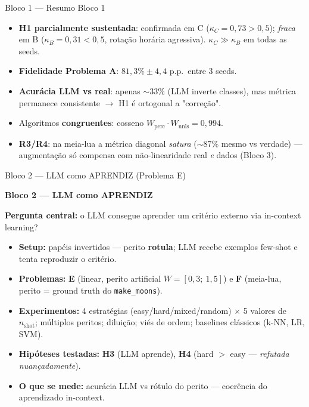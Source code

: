 \documentclass[aspectratio=169,10pt]{beamer}
\begin{document}
\begin{frame}{Bloco 1 --- Resumo Bloco 1}
  \footnotesize
  \begin{itemize}
    \item \textbf{H1 parcialmente sustentada}: confirmada em C ($\kappa_C = 0{,}73 > 0{,}5$); \emph{fraca} em B ($\kappa_B = 0{,}31 < 0{,}5$, rota\c{c}\~ao hor\'aria agressiva). $\kappa_C \gg \kappa_B$ em todas as seeds.
    \item \textbf{Fidelidade Problema A}: $81{,}3\% \pm 4{,}4$ p.p.\ entre 3 seeds.
    \item \textbf{Acur\'acia LLM vs real}: apenas $\sim 33\%$ (LLM inverte classes), mas m\'etrica permanece consistente $\to$ H1 \'e ortogonal a "corre\c{c}\~ao".
    \item Algoritmos \textbf{congruentes}: cosseno $W_{\text{perc}} \cdot W_{\text{nnls}} = 0{,}994$.
    \item \textbf{R3/R4}: na meia-lua a m\'etrica diagonal \emph{satura} ($\sim 87\%$ mesmo vs verdade) --- augmenta\c{c}\~ao s\'o compensa com n\~ao-linearidade real \emph{e} dados (Bloco 3).
  \end{itemize}
\end{frame}


\begin{frame}{Bloco 2 --- LLM como APRENDIZ (Problema E)}
  \footnotesize
  \begin{center}\Large\textbf{Bloco 2 --- LLM como APRENDIZ}\end{center}
  \medskip
  \textbf{Pergunta central:} o LLM consegue aprender um crit\'erio externo via in-context learning?
  \medskip
  \begin{itemize}\setlength\itemsep{0.1em}
    \item \textbf{Setup:} pap\'eis invertidos --- perito \textbf{rotula}; LLM recebe exemplos few-shot e tenta reproduzir o crit\'erio.
    \item \textbf{Problemas:} \textbf{E} (linear, perito artificial $W=[0{,}3;\ 1{,}5]$) e \textbf{F} (meia-lua, perito = ground truth do \texttt{make\_moons}).
    \item \textbf{Experimentos:} 4 estrat\'egias (easy/hard/mixed/random) $\times$ 5 valores de $n_{\text{shot}}$; m\'ultiplos peritos; dilui\c{c}\~ao; vi\'es de ordem; baselines cl\'assicos (k-NN, LR, SVM).
    \item \textbf{Hip\'oteses testadas:} \textbf{H3} (LLM aprende), \textbf{H4} (hard $>$ easy --- \emph{refutada nuan\c{c}adamente}).
    \item \textbf{O que se mede:} acur\'acia LLM vs r\'otulo do perito --- coer\^encia do aprendizado in-context.
  \end{itemize}
\end{frame}
\end{document}
